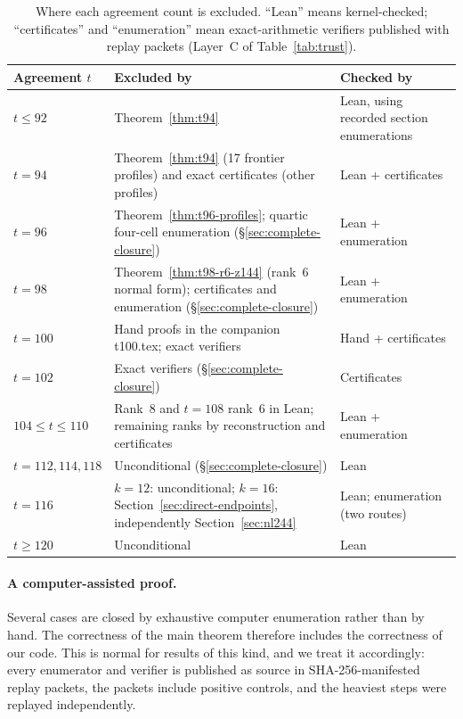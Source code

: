 \documentclass[11pt]{article}
\theoremstyle{definition}
\newcommand{\code}[1]{{\ttfamily\small\renewcommand{\_}{\textunderscore\allowbreak}#1}}
\begin{document}
\begin{table}[ht]
\centering
\small
\begin{tabular}{@{}>{\raggedright\arraybackslash}p{2.6cm}>{\raggedright\arraybackslash}p{6.7cm}>{\raggedright\arraybackslash}p{5.2cm}@{}}
\toprule
\textbf{Agreement $t$} & \textbf{Excluded by} & \textbf{Checked by} \\
\midrule
$t\le 92$ & Theorem~\ref{thm:t94} & Lean, using recorded section enumerations \\
$t=94$ & Theorem~\ref{thm:t94} (17 frontier profiles) and exact certificates (other profiles) & Lean + certificates \\
$t=96$ & Theorem~\ref{thm:t96-profiles}; quartic four-cell enumeration (\S\ref{sec:complete-closure}) & Lean + enumeration \\
$t=98$ & Theorem~\ref{thm:t98-r6-z144} (rank~$6$ normal form); certificates and enumeration (\S\ref{sec:complete-closure}) & Lean + enumeration \\
$t=100$ & Hand proofs in the companion \code{t100.tex}; exact verifiers & Hand + certificates \\
$t=102$ & Exact verifiers (\S\ref{sec:complete-closure}) & Certificates \\
$104\le t\le 110$ & Rank~$8$ and $t=108$ rank~$6$ in Lean; remaining ranks by reconstruction and certificates & Lean + enumeration \\
$t=112,114,118$ & Unconditional (\S\ref{sec:complete-closure}) & Lean \\
$t=116$ & $k=12$: unconditional; $k=16$: Section~\ref{sec:direct-endpoints}, independently Section~\ref{sec:nl244} & Lean; enumeration (two routes) \\
$t\ge 120$ & Unconditional & Lean \\
\bottomrule
\end{tabular}
\caption{Where each agreement count is excluded. ``Lean'' means kernel-checked; ``certificates'' and ``enumeration'' mean exact-arithmetic verifiers published with replay packets (Layer~C of Table~\ref{tab:trust}).}
\label{tab:roadmap}
\end{table}

\paragraph{A computer-assisted proof.}
Several cases are closed by exhaustive computer enumeration rather than by hand. The correctness of the main theorem therefore includes the correctness of our code. This is normal for results of this kind, and we treat it accordingly: every enumerator and verifier is published as source in SHA-256-manifested replay packets, the packets include positive controls, and the heaviest steps were replayed independently.
\end{document}
